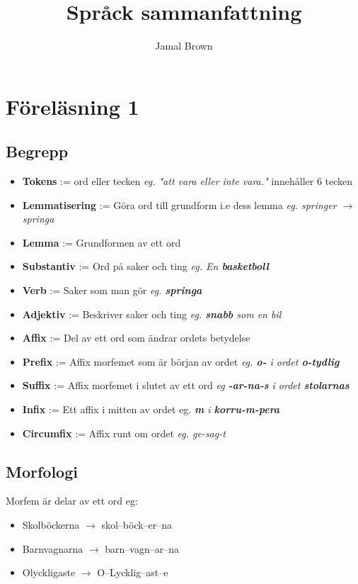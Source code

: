 \documentclass[12pt,a4paper]{article}
\title{Språck sammanfattning}
\author{Jamal Brown}
\begin{document}
\section*{Föreläsning 1}
\subsection*{Begrepp}
\begin{itemize}
    \item \textbf{Tokens} := ord eller tecken \textit{eg. "att vara eller inte vara."} innehåller 6 tecken
    \item \textbf{Lemmatisering} := Göra ord till grundform i.e dess lemma \textit{eg. springer $\rightarrow$ springa}
    \item \textbf{Lemma} := Grundformen av ett ord
    \item \textbf{Substantiv} := Ord på saker och ting \textit{eg. En \textbf{basketboll}}
    \item \textbf{Verb} := Saker som man gör \textit{eg. \textbf{springa}}
    \item \textbf{Adjektiv} := Beskriver saker och ting \textit{eg. \textbf{snabb} som en bil}
    \item \textbf{Affix} := Del av ett ord som ändrar ordets betydelse
    \item \textbf{Prefix} := Affix morfemet som är början av ordet \textit{eg. \textbf{o-} i ordet \textbf{o-tydlig}}
    \item \textbf{Suffix} := Affix morfemet i slutet av ett ord \textit{eg \textbf{-ar-na-s} i ordet \textbf{stolarnas}}
    \item \textbf{Infix} := Ett affix i mitten av ordet eg. \textit{\textbf{m} i \textbf{korru-m-pera}}
    \item \textbf{Circumfix} := Affix runt om ordet \textit{eg. ge-sag-t} 
    
    
\end{itemize}

\noindent\hrulefill

\subsection*{Morfologi}
Morfem är delar av ett ord eg:
\begin{itemize}
    \item Skolböckerna $\rightarrow$ skol--böck--er--na
    \item Barnvagnarna $\rightarrow$ barn--vagn--ar--na
    \item Olyckligaste $\rightarrow$ O--Lycklig--ast--e 
\end{itemize}
\end{document}
